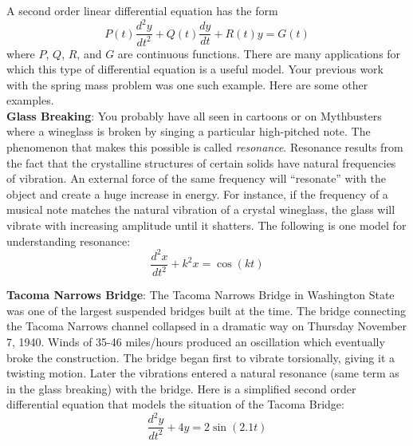 \pagestyle{fancy}
\renewcommand{\theUnit}{13}
\ifthenelse{\isundefined{\UnitPageNumbers}}{}{\setcounter{page}{1}}
\rhead{Unit \theUnit: Second Order Linear DEs}
\rfoot{\mypage}
\lfoot{}
\cfoot{}
\renewcommand{\footrulewidth}{.4pt}
\vspace*{-20pt} \thispagestyle{firstfooter}

A second order linear differential equation has the form
\[
P(t)\frac{d^2y}{dt^2}+Q(t)\frac{dy}{dt}+R(t)y=G(t)
\]
where $P$, $Q$, $R$, and $G$ are continuous functions. There are many applications for which this type of differential equation is a useful model. Your previous work with the spring mass problem was one such example. Here are some other examples. \\

\textbf{Glass Breaking}: You probably have all seen in cartoons or on Mythbusters where a wineglass is broken by singing a particular high-pitched note. The phenomenon that makes this possible is called \textit{resonance}. Resonance results from the fact that the crystalline structures of certain solids have natural frequencies of vibration. An external force of the same frequency will ``resonate'' with the object and create a huge increase in energy. For instance, if the frequency of a musical note matches the natural vibration of a crystal wineglass, the glass will vibrate with increasing amplitude until it shatters. The following is one model for understanding resonance: 
\[
\frac{d^2x}{dt^2}+k^2x=\cos(kt)
\]

\textbf{Tacoma Narrows Bridge}: The Tacoma Narrows Bridge in Washington State was one of the largest suspended bridges built at the time. The bridge connecting the Tacoma Narrows channel collapsed in a dramatic way on Thursday November 7, 1940. Winds of 35-46 miles/hours produced an oscillation which eventually broke the construction. The bridge began first to vibrate torsionally, giving it a twisting motion. Later the vibrations entered a natural resonance (same term as in the glass breaking) with the bridge. Here is a simplified second order differential equation that models the situation of the Tacoma Bridge:
\[
\frac{d^2y}{dt^2}+4y=2\sin(2.1t)
\]

